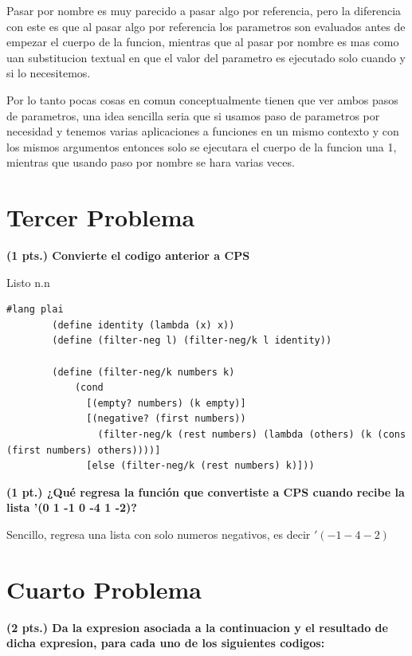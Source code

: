\documentclass[journal,12pt,onecolumn]{IEEEtran}                %
\theoremstyle{break}                                            %
\begin{document}
      Pasar por nombre es muy parecido a pasar algo por referencia, pero la diferencia con este es que al pasar algo por referencia
      los parametros son evaluados antes de empezar el cuerpo de la funcion, mientras que al pasar por nombre es mas como uan substitucion
      textual en que el valor del parametro es ejecutado solo cuando y si lo necesitemos.

      Por lo tanto pocas cosas en comun conceptualmente tienen que ver ambos pasos de parametros, una idea sencilla seria que si usamos paso
      de parametros por necesidad y tenemos varias aplicaciones a funciones en un mismo contexto y con los mismos argumentos entonces
      solo se ejecutara el cuerpo de la funcion una 1, mientras que usando paso por nombre se hara varias veces.

    \section*{Tercer Problema}

      \textbf{(1 pts.) Convierte el codigo anterior a CPS}

      Listo n.n

      \begin{lstlisting}[gobble=8]
        #lang plai
        (define identity (lambda (x) x))
        (define (filter-neg l) (filter-neg/k l identity))
        
        (define (filter-neg/k numbers k)
            (cond
              [(empty? numbers) (k empty)]
              [(negative? (first numbers)) 
                (filter-neg/k (rest numbers) (lambda (others) (k (cons (first numbers) others))))]
              [else (filter-neg/k (rest numbers) k)]))
      \end{lstlisting}

      \textbf{(1 pt.) ¿Qué regresa la función que convertiste a CPS cuando recibe la lista '(0 1 -1 0 -4 1 -2)?}

      Sencillo, regresa una lista con solo numeros negativos, es decir $'(-1 -4 -2)$
    
    \section*{Cuarto Problema}

    \textbf{
      (2 pts.)
      Da la expresion asociada a la continuacion y el resultado de 
      dicha expresion, para cada uno de los siguientes codigos:}
\end{document}
